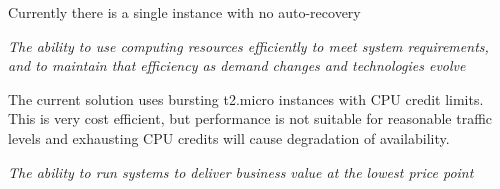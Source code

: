 Currently there is a single instance with no auto-recovery




\textit{The ability to use computing resources efficiently
	to meet system requirements, and to maintain that efficiency as demand changes and technologies evolve}


The current solution uses bursting t2.micro instances with CPU credit limits. This is very cost efficient, but performance is not suitable for reasonable traffic levels and exhausting CPU credits will cause degradation of availability.


\textit{The ability to run systems to deliver business value at the lowest price point}





